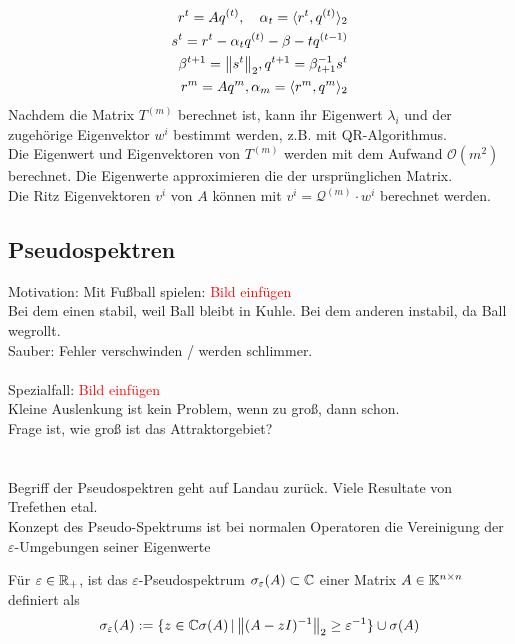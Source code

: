 \begin{align*}
  r^t = Aq^{(t)}, \quad \alpha_t = \langle r^t, q^{(t)}\rangle_2 \\
  s^t = r^t - \alpha_t q^{(t)} - \beta-tq^{(t-1)} \\
  \beta^{t+1} = \vertn{2}{s^t}_2, q^{t+1} = \beta_{t+1}^{-1}s^t \\
  r^m = Aq^m, \alpha_m = \langle r^m,q^m\rangle_2
\end{align*}
Nachdem die Matrix $T^{(m)}$ berechnet ist, kann ihr Eigenwert $\lambda_i$ und der zugehörige Eigenvektor $w^{i}$
bestimmt werden, z.B. mit QR-Algorithmus. \\
Die Eigenwert und Eigenvektoren von $T^{(m)}$ werden mit dem Aufwand $\mathcal{O}(m^2)$ berechnet. Die Eigenwerte 
approximieren die der ursprünglichen Matrix. \\
Die Ritz Eigenvektoren $v^i$ von $A$ können mit $v^i=\mathcal{Q}^{(m)}\cdot w^i$ berechnet werden.

\subsection{Pseudospektren}
Motivation:
Mit Fußball spielen: \textcolor{red}{Bild einfügen} \\
Bei dem einen stabil, weil Ball bleibt in Kuhle. Bei dem anderen instabil, da Ball wegrollt.
\\
Sauber: Fehler verschwinden / werden schlimmer. \\ \\
Spezialfall: \textcolor{red}{Bild einfügen} \\
Kleine Auslenkung ist kein Problem, wenn zu groß, dann schon. \\
Frage ist, wie groß ist das Attraktorgebiet? \\ \\ \\

Begriff der Pseudospektren geht auf Landau zurück. Viele Resultate von Trefethen etal. \\
Konzept des Pseudo-Spektrums ist bei normalen Operatoren die Vereinigung der $\varepsilon$-Umgebungen seiner Eigenwerte

\begin{defbox}
  Für $\varepsilon\in\mathbb R_+$, ist das $\varepsilon$-Pseudospektrum $\sigma_\varepsilon(A)\subset\mathbb C  $ 
  einer Matrix $A\in\mathbb K^{n\times n}$ definiert als 
  \begin{align*}
    \sigma_\varepsilon(A) := \{z\in\C  \sigma(A)\,|\, \vertn{2}{(A-zI)^{-1}}_2\geq \varepsilon^{-1}\} \cup \sigma(A)
  \end{align*}
\end{defbox}

